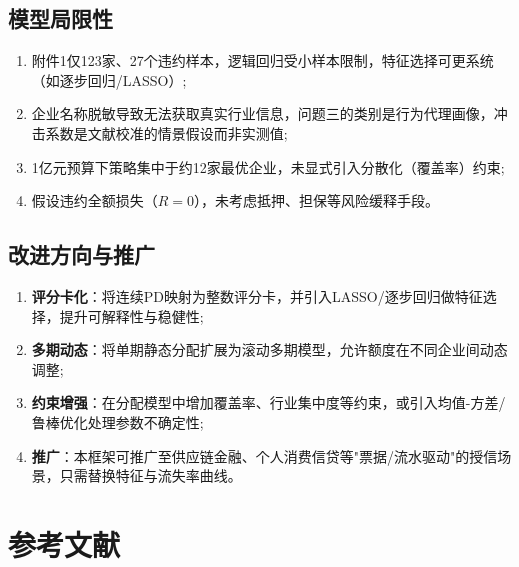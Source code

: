 \documentclass[12pt, a4paper]{article}
\begin{document}
\subsection{模型局限性}

\begin{enumerate}
    \item 附件1仅123家、27个违约样本，逻辑回归受小样本限制，特征选择可更系统（如逐步回归/LASSO）;
    \item 企业名称脱敏导致无法获取真实行业信息，问题三的类别是行为代理画像，冲击系数是文献校准的情景假设而非实测值;
    \item 1亿元预算下策略集中于约12家最优企业，未显式引入分散化（覆盖率）约束;
    \item 假设违约全额损失（$R=0$），未考虑抵押、担保等风险缓释手段。
\end{enumerate}

\subsection{改进方向与推广}

\begin{enumerate}
    \item \textbf{评分卡化}：将连续PD映射为整数评分卡，并引入LASSO/逐步回归做特征选择，提升可解释性与稳健性;
    \item \textbf{多期动态}：将单期静态分配扩展为滚动多期模型，允许额度在不同企业间动态调整;
    \item \textbf{约束增强}：在分配模型中增加覆盖率、行业集中度等约束，或引入均值-方差/鲁棒优化处理参数不确定性\cite{Torkian2025};
    \item \textbf{推广}：本框架可推广至供应链金融、个人消费信贷等"票据/流水驱动"的授信场景，只需替换特征与流失率曲线。
\end{enumerate}

\section*{参考文献}
\end{document}
